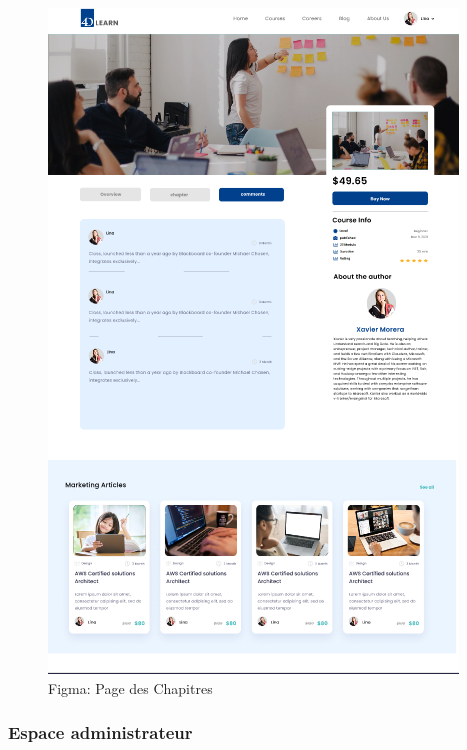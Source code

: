 \begin{figure}[H]
\begin{minipage}{0.45\textwidth}
        \includegraphics[width=\textwidth]{Figures/comment.PNG}
        \caption{Figma: Page des Chapitres}
    \end{minipage}
    
\end{figure}

\subsubsection{Espace administrateur}

